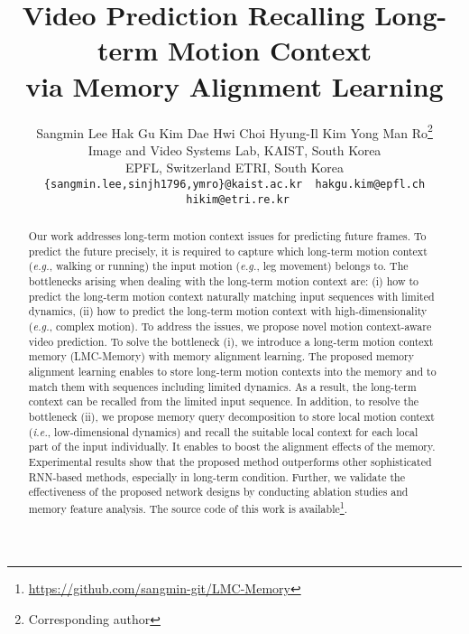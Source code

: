 \documentclass[final]{cvpr}
\begin{document}
\title{Video Prediction Recalling Long-term Motion Context \\ via Memory Alignment Learning}

\author{Sangmin Lee \;\; Hak Gu Kim \;\; Dae Hwi Choi \;\; Hyung-Il Kim \;\; Yong Man Ro\thanks{Corresponding author}\\ 
 Image and Video Systems Lab, KAIST, South Korea\\
 EPFL, Switzerland  \;\;\;   ETRI, South Korea\\
{\tt\small\{sangmin.lee,sinjh1796,ymro\}@kaist.ac.kr \ hakgu.kim@epfl.ch \ hikim@etri.re.kr}
}

\maketitle


\begin{abstract}
   Our work addresses long-term motion context issues for predicting future frames. To predict the future precisely, it is required to capture which long-term motion context (\textit{e.g.}, walking or running) the input motion (\textit{e.g.}, leg movement) belongs to. The bottlenecks arising when dealing with the long-term motion context are: (i) how to predict the long-term motion context naturally matching input sequences with limited dynamics, (ii) how to predict the long-term motion context with high-dimensionality (\textit{e.g.}, complex motion). To address the issues, we propose novel motion context-aware video prediction. To solve the bottleneck (i), we introduce a long-term motion context memory (LMC-Memory) with memory alignment learning. The proposed memory alignment learning enables to store long-term motion contexts into the memory and to match them with sequences including limited dynamics. As a result, the long-term context can be recalled from the limited input sequence. In addition, to resolve the bottleneck (ii), we propose memory query decomposition to store local motion context (\textit{i.e.}, low-dimensional dynamics) and recall the suitable local context for each local part of the input individually. It enables to boost the alignment effects of the memory. Experimental results show that the proposed method outperforms other sophisticated RNN-based methods, especially in long-term condition. Further, we validate the effectiveness of the proposed network designs by conducting ablation studies and memory feature analysis. The source code of this work is available\footnote[2]{\url{https://github.com/sangmin-git/LMC-Memory}}. 
\end{abstract}
\end{document}
